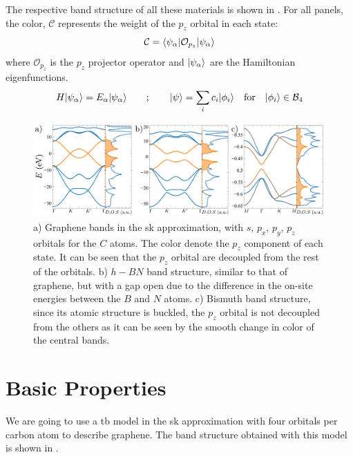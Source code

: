 The respective band structure of all these materials is shown in .
For all panels, the color, $\mathcal{C}$ represents the weight of the $p_z$ orbital in each state:
\begin{equation*}
   \mathcal{C} = \langle\psi_{\alpha}|\mathcal{O}_{p_z}|\psi_{\alpha}\rangle
\end{equation*}
where $\mathcal{O}_{p_z}$ is the $p_z$ projector operator and $|\psi_{\alpha}\rangle$ are the Hamiltonian eigenfunctions.
\begin{equation*}
  H|\psi_{\alpha}\rangle = E_{\alpha}|\psi_{\alpha}\rangle \qquad ; \qquad
   |\psi\rangle = \sum_i c_i|\phi_i\rangle \quad
   \text{for} \quad|\phi_i\rangle\in\mathcal{B}_4
\end{equation*}
\begin{figure}[h!]
\centering
\includegraphics{graphene/figures/banddos.pdf}
\vspace{-15pt}
\caption{a) Graphene bands in the \ac{sk} approximation, with $s$, $p_x$, $p_y$, $p_z$ orbitals for the $C$ atoms. The color denote the $p_z$ component of each state. It can be seen that the $p_z$ orbital are decoupled from the rest of the orbitals. b) $h-BN$ band structure, similar to that of graphene, but with a gap open due to the difference in the on-site energies between the $B$ and $N$ atoms. c) Bismuth band structure, since its atomic structure is buckled, the $p_z$ orbital is not decoupled from the others as it can be seen by the smooth change in color of the central bands.}
\label{SKbands}
\end{figure}
\FloatBarrier


\section{Basic Properties}
\label{sec:graphene_basic_properties}
%
%
We are going to use a \ac{tb} model in the \ac{sk} approximation with four orbitals per carbon atom to describe graphene. The band structure obtained with this model is shown in .

